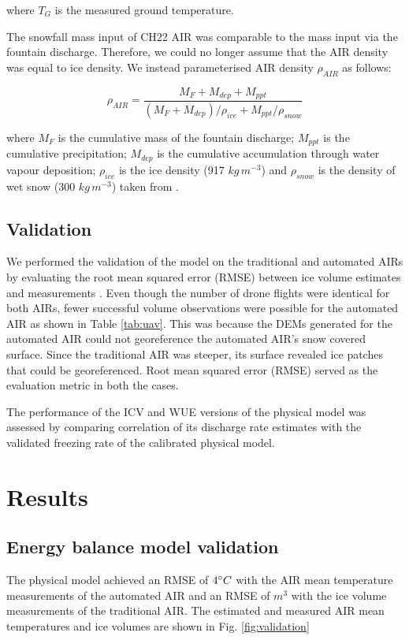 \documentclass[tc, manuscript]{copernicus}
\begin{document}
where $T_{G}$ is the measured ground temperature.

The snowfall mass input of CH22 AIR was comparable to the mass input via the fountain discharge. Therefore, we
could no longer assume that the AIR density was equal to ice density. We instead parameterised AIR density
$\rho_{AIR}$ as follows:

\begin{equation}
  \rho_{AIR} = \frac{M_{F} + M_{dep} + M_{ppt}}{(M_{F} + M_{dep})/\rho_{ice} + M_{ppt}/\rho_{snow}}
\end{equation}

where $M_F$ is the cumulative mass of the fountain discharge; $M_{ppt}$ is the cumulative precipitation;
$M_{dep}$ is the cumulative accumulation through water vapour deposition; $\rho_{ice}$ is the ice density (917
$kg\,m^{-3}$) and $\rho_{snow}$ is the density of wet snow (300 $kg\,m^{-3}$) taken from
\cite{cuffeyPhysicsGlaciers2010} .

\subsection{Validation}
We performed the validation of the model on the traditional and automated AIRs by evaluating the root mean
squared error (RMSE) between ice volume estimates and measurements . Even though the number of drone flights
were identical for both AIRs, fewer successful volume observations were possible for the automated AIR as shown
in Table \ref{tab:uav}. This was because the DEMs generated for the automated AIR could not georeference the
automated AIR's snow covered surface. Since the traditional AIR was steeper, its surface revealed ice patches
that could be georeferenced. Root mean squared error (RMSE) served as the evaluation metric in both the cases.

The performance of the ICV and WUE versions of the physical model was assessed by comparing correlation of its
discharge rate estimates with the validated freezing rate of the calibrated physical model.

\section{Results}

\subsection{Energy balance model validation}
The physical model achieved an RMSE of $4 ^{\circ} C$ with the AIR mean temperature measurements of the automated
AIR and an RMSE of $m^3$ with the ice volume measurements of the traditional AIR. The estimated and measured AIR
mean temperatures and ice volumes are shown in Fig. \ref{fig:validation}
 
\end{document}
